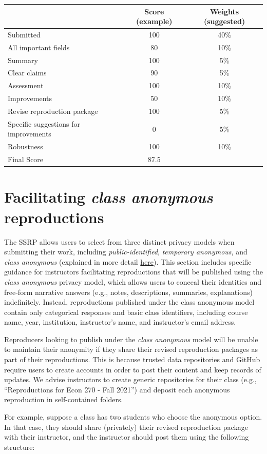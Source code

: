 \documentclass[
]{book}
\begin{document}
\begin{longtable}[]{@{}lcc@{}}
\toprule
& Score (example) & Weights (suggested)\tabularnewline
\midrule
\endhead
Submitted & 100 & 40\%\tabularnewline
All important fields & 80 & 10\%\tabularnewline
Summary & 100 & 5\%\tabularnewline
Clear claims & 90 & 5\%\tabularnewline
Assessment & 100 & 10\%\tabularnewline
Improvements & 50 & 10\%\tabularnewline
Revise reproduction package & 100 & 5\%\tabularnewline
Specific suggestions for improvements & 0 & 5\%\tabularnewline
Robustness & 100 & 10\%\tabularnewline
Final Score & 87.5 &\tabularnewline
\bottomrule
\end{longtable}

\hypertarget{facilitating-class-anonymous-reproductions}{%
\section{\texorpdfstring{Facilitating \emph{class anonymous} reproductions}{Facilitating class anonymous reproductions}}\label{facilitating-class-anonymous-reproductions}}

The SSRP allows users to select from three distinct privacy models when submitting their work, including \emph{public-identified}, \emph{temporary anonymous}, and \emph{class anonymous} (explained in more detail \href{https://bitss.github.io/ACRE/concluding-the-reproduction.html\#visibility-and-data-use}{here}). This section includes specific guidance for instructors facilitating reproductions that will be published using the \emph{class anonymous} privacy model, which allows users to conceal their identities and free-form narrative answers (e.g., notes, descriptions, summaries, explanations) indefinitely. Instead, reproductions published under the class anonymous model contain only categorical responses and basic class identifiers, including course name, year, institution, instructor's name, and instructor's email address.

Reproducers looking to publish under the \emph{class anonymous} model will be unable to maintain their anonymity if they share their revised reproduction packages as part of their reproductions. This is because trusted data repositories and GitHub require users to create accounts in order to post their content and keep records of updates. We advise instructors to create generic repositories for their class (e.g., ``Reproductions for Econ 270 - Fall 2021'') and deposit each anonymous reproduction in self-contained folders.

For example, suppose a class has two students who choose the anonymous option. In that case, they should share (privately) their revised reproduction package with their instructor, and the instructor should post them using the following structure:
\end{document}
